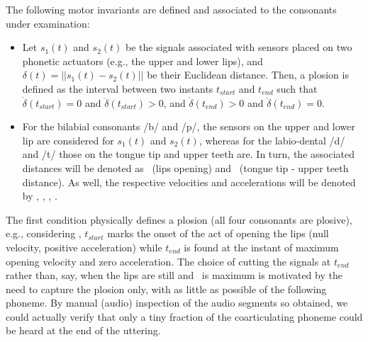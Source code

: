 The following motor invariants are defined and associated to the consonants under
examination:

\begin{itemize}

  \item Let $s_1(t)$ and $s_2(t)$ be the signals associated
    with sensors placed on two phonetic actuators (e.g., the upper and
    lower lips), and $\delta(t) = ||s_1(t)-s_2(t)||$ be their
    Euclidean distance. Then, a plosion is defined as the interval
    between two instants $t_{start}$ and $t_{end}$ such that
    $\dot{\delta}(t_{start}) = 0 $ and $\ddot{\delta}(t_{start}) > 0$,
    and $\dot{\delta}(t_{end}) > 0 $ and $\ddot{\delta}(t_{end}) = 0$.

  \item For the bilabial consonants /b/ and /p/, the sensors on the upper and lower
    lip are considered for $s_1(t)$ and $s_2(t)$, whereas for the labio-dental /d/ and /t/
    those on the tongue tip and upper teeth are. In turn, the associated
    distances will be denoted as \lio\ (lips opening) and \ttu\
    (tongue tip - upper teeth distance). As well, the respective velocities
    and accelerations will be denoted by \vlio, \vttu, \alio, \attu.

\end{itemize}

The first condition physically defines a plosion (all four consonants are plosive), e.g., considering \lio, $t_{start}$
marks the onset of the act of opening the lips (null velocity, positive acceleration)
while $t_{end}$ is found at the instant of maximum opening velocity and zero acceleration.
The choice of cutting the signals at $t_{end}$ rather than, say, when the lips are still
and \lio\ is maximum is motivated by the need to capture the plosion only, with as little
as possible of the following phoneme. By manual (audio) inspection of the audio segments so
obtained, we could actually verify that only a tiny fraction of the coarticulating phoneme
could be heard at the end of the uttering.

